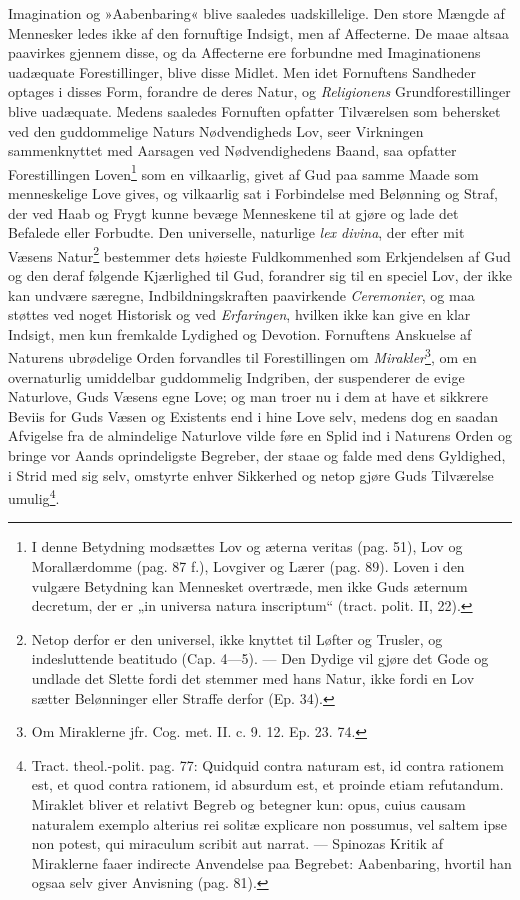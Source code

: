 \documentclass[12pt,a4paper]{book}
\newcommand{\opage}[1]{\marginnote{\footnotesize\textit{[#1]}}}
\begin{document}
\opage{153} \setcounter{footnote}{0}%
Imagination og »Aabenbaring« blive saaledes uadskillelige. Den store Mængde af Mennesker ledes ikke af den fornuftige Indsigt, men af Affecterne. De maae altsaa paavirkes gjennem disse, og da Affecterne ere forbundne med Imaginationens uadæquate Forestillinger, blive disse Midlet. Men idet Fornuftens Sandheder optages i disses Form, forandre de deres Natur, og \emph{Religionens} Grundforestillinger blive uadæquate. Medens saaledes Fornuften opfatter Tilværelsen som behersket ved den guddommelige Naturs Nødvendigheds Lov, seer Virkningen sammenknyttet med Aarsagen ved Nødvendighedens Baand, saa opfatter Forestillingen Loven\footnote{I denne Betydning modsættes Lov og æterna veritas (pag. 51), Lov og Morallærdomme (pag. 87 f.), Lovgiver og Lærer (pag. 89). Loven i den vulgære Betydning kan Mennesket overtræde, men ikke Guds æternum decretum, der er „in universa natura inscriptum“ (tract. polit. II, 22).} som en vilkaarlig, givet af Gud paa samme Maade som menneskelige Love gives, og vilkaarlig sat i Forbindelse med Belønning og Straf, der ved Haab og Frygt kunne bevæge Menneskene til at gjøre og lade det Befalede eller Forbudte. Den universelle, naturlige \emph{lex divina}, der efter mit Væsens Natur\footnote{Netop derfor er den universel, ikke knyttet til Løfter og Trusler, og indesluttende beatitudo (Cap. 4---5). --- Den Dydige vil gjøre det Gode og undlade det Slette fordi det stemmer med hans Natur, ikke fordi en Lov sætter Belønninger eller Straffe derfor (Ep. 34).} bestemmer dets høieste Fuldkommenhed som Erkjendelsen af Gud og den deraf følgende Kjærlighed til Gud, forandrer sig til en speciel Lov, der ikke kan undvære særegne, Indbildningskraften paavirkende \emph{Ceremonier}, og maa støttes ved noget Historisk og ved \emph{Erfaringen}, hvilken ikke kan give en klar Indsigt, men kun fremkalde Lydighed og Devotion. Fornuftens Anskuelse af Naturens ubrødelige Orden forvandles til Forestillingen om
\opage{154} \setcounter{footnote}{0}%
\emph{Mirakler}\footnote{Om Miraklerne jfr. Cog. met. II. c. 9. 12. Ep. 23. 74.}, om en overnaturlig umiddelbar guddommelig Indgriben, der suspenderer de evige Naturlove, Guds Væsens egne Love; og man troer nu i dem at have et sikkrere Beviis for Guds Væsen og Existents end i hine Love selv, medens dog en saadan Afvigelse fra de almindelige Naturlove vilde føre en Splid ind i Naturens Orden og bringe vor Aands oprindeligste Begreber, der staae og falde med dens Gyldighed, i Strid med sig selv, omstyrte enhver Sikkerhed og netop gjøre Guds Tilværelse umulig\footnote{Tract. theol.-polit. pag. 77: Quidquid contra naturam est, id contra rationem est, et quod contra rationem, id absurdum est, et proinde etiam refutandum. Miraklet bliver et relativt Begreb og betegner kun: opus, cuius causam naturalem exemplo alterius rei solitæ explicare non possumus, vel saltem ipse non potest, qui miraculum scribit aut narrat. --- Spinozas Kritik af Miraklerne faaer indirecte Anvendelse paa Begrebet: Aabenbaring, hvortil han ogsaa selv giver Anvisning (pag. 81).}.
\end{document}
